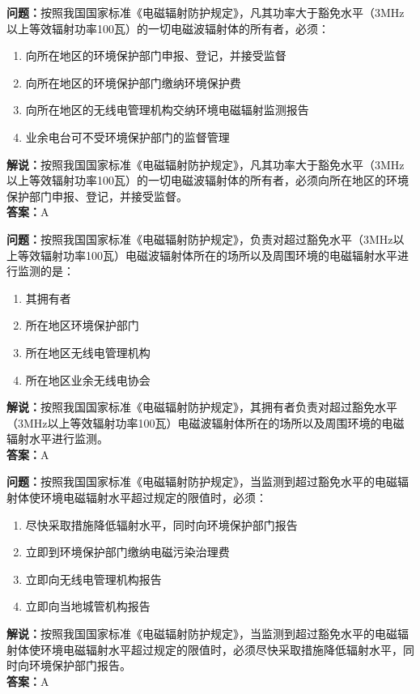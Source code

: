 \documentclass[UTF8]{ctexbook}
\begin{document}
\textbf{问题：}按照我国国家标准《电磁辐射防护规定》，凡其功率大于豁免水平（3MHz以上等效辐射功率100瓦）的一切电磁波辐射体的所有者，必须：
\begin{enumerate}[label=\Alph*), leftmargin=3em]
  \item 向所在地区的环境保护部门申报、登记，并接受监督
  \item 向所在地区的环境保护部门缴纳环境保护费
  \item 向所在地区的无线电管理机构交纳环境电磁辐射监测报告
  \item 业余电台可不受环境保护部门的监督管理
\end{enumerate}
\textbf{解说：}按照我国国家标准《电磁辐射防护规定》，凡其功率大于豁免水平（3MHz以上等效辐射功率100瓦）的一切电磁波辐射体的所有者，必须向所在地区的环境保护部门申报、登记，并接受监督。\\
\textbf{答案：}A

\textbf{问题：}按照我国国家标准《电磁辐射防护规定》，负责对超过豁免水平（3MHz以上等效辐射功率100瓦）电磁波辐射体所在的场所以及周围环境的电磁辐射水平进行监测的是：
\begin{enumerate}[label=\Alph*), leftmargin=3em]
  \item 其拥有者
  \item 所在地区环境保护部门
  \item 所在地区无线电管理机构
  \item 所在地区业余无线电协会
\end{enumerate}
\textbf{解说：}按照我国国家标准《电磁辐射防护规定》，其拥有者负责对超过豁免水平（3MHz以上等效辐射功率100瓦）电磁波辐射体所在的场所以及周围环境的电磁辐射水平进行监测。\\
\textbf{答案：}A

\textbf{问题：}按照我国国家标准《电磁辐射防护规定》，当监测到超过豁免水平的电磁辐射体使环境电磁辐射水平超过规定的限值时，必须：
\begin{enumerate}[label=\Alph*), leftmargin=3em]
  \item 尽快采取措施降低辐射水平，同时向环境保护部门报告
  \item 立即到环境保护部门缴纳电磁污染治理费
  \item 立即向无线电管理机构报告
  \item 立即向当地城管机构报告
\end{enumerate}
\textbf{解说：}按照我国国家标准《电磁辐射防护规定》，当监测到超过豁免水平的电磁辐射体使环境电磁辐射水平超过规定的限值时，必须尽快采取措施降低辐射水平，同时向环境保护部门报告。\\
\textbf{答案：}A
\end{document}
